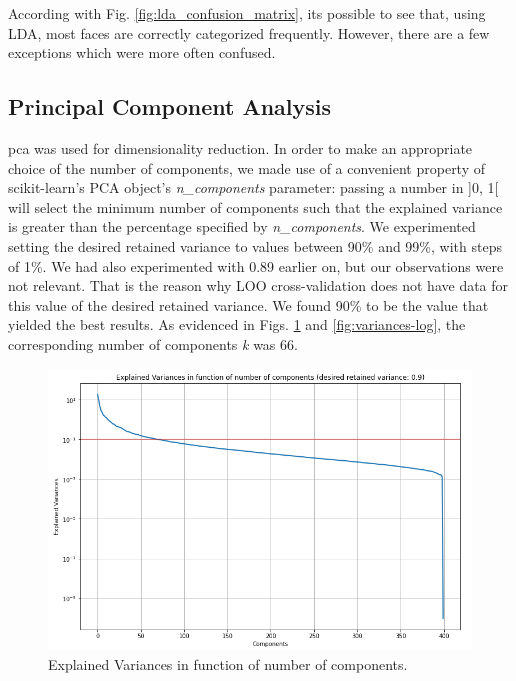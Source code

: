 \documentclass[conference]{IEEEtran}
\begin{document}
According with Fig. \ref{fig:lda_confusion_matrix}, its possible to see that, using LDA, most faces are correctly categorized frequently. However, there are a few exceptions which were more often confused.

\subsection{Principal Component Analysis}

\gls{pca} was used for dimensionality reduction. In order to make an appropriate choice of the number of components, we made use of a convenient property of scikit-learn's PCA object's \textit{n\_components} parameter: passing a number in ]0, 1[ will select the minimum number of components such that the explained variance is greater than the percentage specified by \textit{n\_components}. We experimented setting the desired retained variance to values between 90\% and 99\%, with steps of 1\%. We had also experimented with 0.89 earlier on, but our observations were not relevant. That is the reason why LOO cross-validation does not have data for this value of the desired retained variance. We found 90\% to be the value that yielded the best results. As evidenced in Figs. \ref{fig:variances} and \ref{fig:variances-log}, the corresponding number of components \textit{k} was 66.

\begin{figure}
    \centering
    \includegraphics[scale=0.5]{images/4_explained_vars.png}
    \caption{Explained Variances in function of number of components.}
    \label{fig:variances}
\end{figure}
\end{document}
